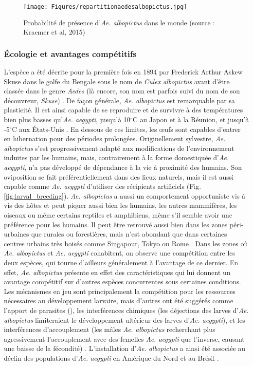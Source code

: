 \begin{figure}[t]
	\centering
	\texttt{[image: Figures/repartitionaedesalbopictus.jpg]}
	\caption{Probabilité de présence d'{\em Ae. albopictus} dans le monde (source : Kraemer et al, 2015)}
	\label{fig:repartitionaedesalbopictus}
\end{figure}


\subsubsection{Écologie et avantages compétitifs}

L'espèce a été décrite pour la première fois en 1894 par Frederick Arthur Askew Skuse dans le golfe du Bengale sous le nom de {\em Culex albopictus} avant d'être classée dans le genre {\em Aedes} (là encore, son nom est parfois suivi du nom de son découvreur, {\em Skuse}) \cite{skuse1894banded}. 
De façon générale, {\em Ae. albopictus} est remarquable par sa plasticité. 
Il est ainsi capable de se reproduire et de survivre à des températures bien plus basses qu'{\em Ae. aegypti}, jusqu'à 10$^\circ$C au Japon et à la Réunion, et jusqu'à -5$^\circ$C aux États-Unis \cite{paupy2009aedes}. 
En dessous de ces limites, les \oe ufs sont capables d'entrer en hibernation pour des périodes prolongées.
Originellement sylvestre, {\em Ae. albopictus} s'est progressivement adapté aux modifications de l'environnement induites par les humains, mais, contrairement à la forme domestiquée d'{\em Ae. aegypti}, n'a pas développé de dépendance à la vie à proximité des humains.
Son oviposition se fait préférentiellement dans des lieux naturels, mais il est aussi capable comme {\em Ae. aegypti} d'utiliser des récipients artificiels (Fig. \ref{fig:larval_breeding}).
{\em Ae. albopictus} a aussi un comportement opportuniste vis à vis des hôtes et peut piquer aussi bien les humains, les autres mammifères, les oiseaux ou même certains reptiles et amphibiens, même s'il semble avoir une préférence pour les humains.
Il peut être retrouvé aussi bien dans les zones péri-urbaines que rurales ou forestières, mais n'est abondant que dans certaines centres urbains très boisés comme Singapour, Tokyo ou Rome \cite{paupy2009aedes}.
Dans les zones où {\em Ae. albopictus} et {\em Ae. aegypti} cohabitent, on observe une compétition entre les deux espèces, qui tourne d'ailleurs généralement à l'avantage de ce dernier.
En effet, {\em Ae. albopictus} présente en effet des caractéristiques qui lui donnent un avantage compétitif sur d'autres espèces concurrentes sous certaines conditions.
Les mécanismes en jeu sont principalement la compétition pour les ressources nécessaires au développement larvaire, mais d'autres ont été suggérés comme l'apport de parasites (), les interférences chimiques (les déjections des larves d'{\em Ae. albopictus} limiteraient le développement ultérieur des larves d'{\em Ae. aegypti}), et les interférences d'accouplement (les mâles {\em Ae. albopictus} recherchant plus agressivement l'accouplement avec des femelles {\em Ae. aegypti} que l'inverse, causant une baisse de la fécondité) \cite{juliano2005ecology}.
L'installation d'{\em Ae. albopictus} a ainsi été associée au déclin des populations d'{\em Ae. aegypti} en Amérique du Nord et au Brésil \cite{paupy2009aedes}.


